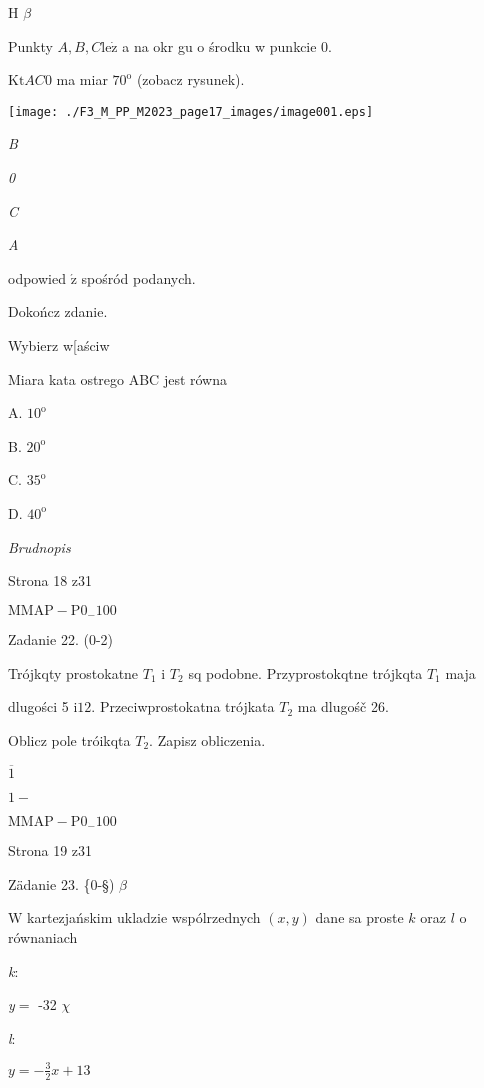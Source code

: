\documentclass[a4paper,12pt]{article}
\begin{document}
H $\beta$

Punkty $A, B, C \mathrm{l}\mathrm{e}\dot{\mathrm{z}}$ a na okr gu o środku w punkcie 0.

$\mathrm{K} \mathrm{t} AC0$ ma miar $70^{\mathrm{o}}$ (zobacz rysunek).
\begin{center}
\texttt{[image: ./F3\_M\_PP\_M2023\_page17\_images/image001.eps]}
\end{center}
{\it B}

{\it 0}

{\it C}

{\it A}

odpowied $\acute{\mathrm{z}}$ spośród podanych.

Dokończ zdanie.

Wybierz w[aściw

Miara kata ostrego ABC jest równa

A. $10^{\mathrm{o}}$

B. $20^{\mathrm{o}}$

C. $35^{\mathrm{o}}$

D. $40^{\mathrm{o}}$

{\it Brudnopis}

Strona 18 z31

$\mathrm{M}\mathrm{M}\mathrm{A}\mathrm{P}-\mathrm{P}0_{-}100$





Zadanie 22. (0-2)

Trójkqty prostokatne $T_{1}$ i $T_{2}$ sq podobne. Przyprostokqtne trójkqta $T_{1}$ maja

dlugości 5 $\mathrm{i} 12$. Przeciwprostokatna trójkata $T_{2}$ ma dlugośč 26.

Oblicz pole tróikqta $T_{2}$. Zapisz obliczenia.

$\overline{1}$

$1-$

$\mathrm{M}\mathrm{M}\mathrm{A}\mathrm{P}-\mathrm{P}0_{-}100$

Strona 19 z31





Zädanie 23. \{0-\S) $\beta$

$\mathrm{W}$ kartezjańskim ukladzie wspólrzednych $(x,y)$ dane sa proste $k$ oraz $l$ o równaniach

{\it k}:

{\it y}$=$ -32 $\chi$

{\it l}:

$y=-\displaystyle \frac{3}{2}x+13$
\end{document}
